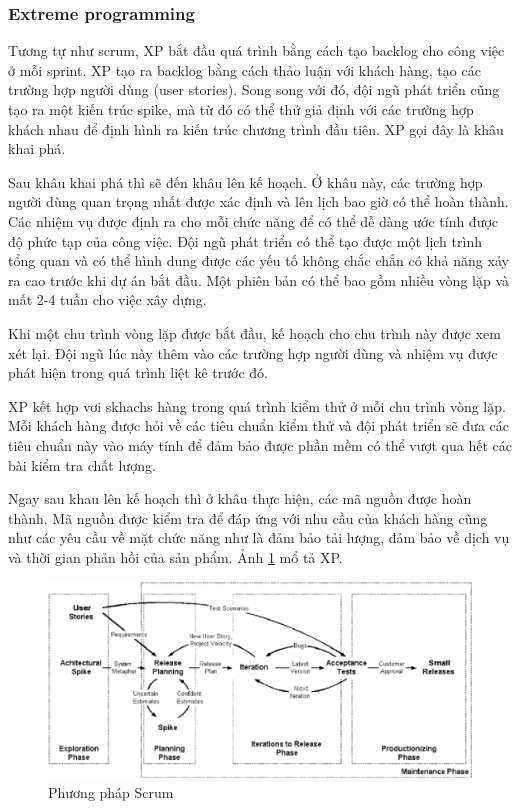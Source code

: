 \documentclass{article}
\begin{document}
	\subsubsection{Extreme programming}
	
	Tương tự như scrum, XP bắt đầu quá trình bằng cách tạo backlog cho công việc ở mỗi sprint. XP tạo ra backlog bằng cách thảo luận với khách hàng, tạo các trường hợp người dùng (user stories). Song song với đó, đội ngũ phát triển cũng tạo ra một kiến trúc spike, mà từ đó có thể thử giả định với các trường hợp khách nhau để định hình ra kiến trúc chương trình đầu tiên. XP gọi đây là khâu khai phá.
	
	Sau khâu khai phá thì sẽ đến khâu lên kế hoạch. Ở khâu này, các trường hợp người dùng quan trọng nhất được xác định và lên lịch bao giờ có thể hoàn thành. Các nhiệm vụ được định ra cho mỗi chức năng để có thể dễ dàng ước tính được độ phức tạp của công việc. Đội ngũ phát triển có thể tạo được một lịch trình tổng quan và có thể hình dung được các yếu tố không chắc chắn có khả năng xảy ra cao trước khi dự án bắt đầu. Một phiên bản có thể bao gồm nhiều vòng lặp và mất 2-4 tuần cho việc xây dựng.
	
	Khi một chu trình vòng lặp được bắt đầu, kế hoạch cho chu trình này được xem xét lại. Đội ngũ lúc này thêm vào các trường hợp người dùng và nhiệm vụ được phát hiện trong quá trình liệt kê trước đó.
	
	XP kết hợp vơi skhachs hàng trong quá trình kiểm thử ở mỗi chu trình vòng lặp. Mỗi khách hàng được hỏi về các tiêu chuẩn kiểm thử và đội phát triển sẽ đưa các tiêu chuẩn này vào máy tính để đảm bảo được phần mềm có thể vượt qua hết các bài kiểm tra chất lượng.
	
	Ngay sau khau lên kế hoạch thì ở khâu thực hiện, các mã nguồn được hoàn thành. Mã nguồn được kiểm tra để đáp ứng với nhu cầu của khách hàng cũng như các yêu cầu về mặt chức năng như là đảm bảo tải lượng, đảm bảo về dịch vụ và thời gian phản hồi của sản phẩm. Ảnh \ref{fig:xp} mổ tả XP.
	
		\begin{figure}[h]
			\centering
			\includegraphics[scale=0.3]{figures/xp.png}
			\caption{Phương pháp Scrum \cite{poccia1970}}
			\label{fig:xp}
		\end{figure}
	
\end{document}
